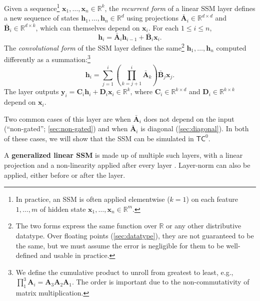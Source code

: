 \begin{definition}
    \label{def:generalized-linear-ssm}
    Given a sequence\footnote{In practice, an SSM is often applied elementwise ($k=1$) on each feature $1, \ldots, m$ of hidden state $\mathbf x_1, \ldots, \mathbf x_n \in \mathbb R^m$.} $\mathbf x_1, \ldots, \mathbf x_n \in \mathbb R^k$, the \emph{recurrent form} of a linear SSM layer defines a new sequence of states $\mathbf h_1, \ldots, \mathbf h_n \in \mathbb R^d$ using projections $\bar{\mathbf A}_i \in \mathbb R^{d \times d}$ and $\bar{\mathbf B}_i \in \mathbb R^{d \times k}$, which can themselves depend on $\mathbf x_i$. For each $1 \leq i \leq n$,
    \begin{equation}
        \label{eqn:recurrent}
        \mathbf h_i = \bar{\mathbf A}_i \mathbf h_{i-1} + \bar{\mathbf B}_i \mathbf x_i .
        \tag{Recurrent form}
    \end{equation}
    The \emph{convolutional form} of the SSM layer defines the same\footnote{The two forms express the same function over $\mathbb R$ or any other distributive datatype. Over floating points (\ref{sec:datatype}), they are not guaranteed to be the same, but we must assume the error is negligible for them to be well-defined and usable in practice.} $\mathbf h_1, \ldots, \mathbf h_n$ computed differently as a summation:\footnote{We define the cumulative product to unroll from greatest to least, e.g., $\prod_1^3 \mathbf A_i = \mathbf A_3 \mathbf A_2 \mathbf A_1$. The order is important due to the non-commutativity of matrix multiplication.}
    \begin{equation}
        \label{eqn:convolutional}
        \mathbf h_i = \sum_{j=1}^i \left( \prod_{k=j+1}^i \bar{\mathbf A}_k \right) \bar{\mathbf B}_j \mathbf x_j .
        \tag{Convolutional form}
    \end{equation}
    The layer outputs $\mathbf y_i = \mathbf C_i \mathbf h_i + \mathbf D_i \mathbf x_i \in \mathbb R^k$, where $\mathbf C_i \in \mathbb R^{k \times d}$ and $\mathbf D_i \in \mathbb R^{k \times k}$ depend on $\mathbf x_i$.
\end{definition}

Two common cases of this layer are when $\bar{\mathbf A}_i$ does not depend on the input (``non-gated''; \ref{sec:non-gated}) and when $\bar{\mathbf A}_i$ is diagonal (\ref{sec:diagonal}). In both of these cases, we will show that the SSM can be simulated in $\mathsf{TC}^0$.

A \textbf{generalized linear SSM} is made up of multiple such layers, with a linear projection and a non-linearity applied after every layer \citep{rush2022s4}. Layer-norm can also be applied, either before or after the layer.

